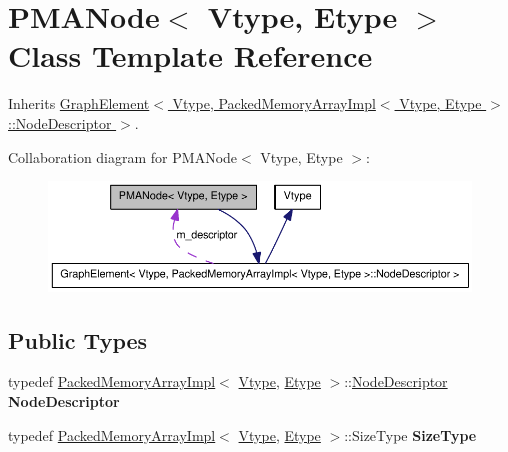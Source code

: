 \hypertarget{class_p_m_a_node}{
\section{PMANode$<$ Vtype, Etype $>$ Class Template Reference}
\label{class_p_m_a_node}
}


Inherits \hyperlink{class_graph_element}{GraphElement$<$ Vtype, PackedMemoryArrayImpl$<$ Vtype, Etype $>$::NodeDescriptor $>$}.



Collaboration diagram for PMANode$<$ Vtype, Etype $>$:\nopagebreak
\begin{figure}[H]
\begin{center}
\leavevmode
\includegraphics[width=400pt]{class_p_m_a_node__coll__graph}
\end{center}
\end{figure}
\subsection*{Public Types}
\begin{DoxyCompactItemize}
\item 
\hypertarget{class_p_m_a_node_a3246093f39da4feafb9e35c806cc2ff9}{
typedef \hyperlink{class_packed_memory_array_impl}{PackedMemoryArrayImpl}$<$ \hyperlink{class_vtype}{Vtype}, \hyperlink{class_etype}{Etype} $>$::\hyperlink{class_p_m_a_node}{NodeDescriptor} {\bfseries NodeDescriptor}}
\label{class_p_m_a_node_a3246093f39da4feafb9e35c806cc2ff9}

\item 
\hypertarget{class_p_m_a_node_af2610b975fca4e604a43d94c208f53dd}{
typedef \hyperlink{class_packed_memory_array_impl}{PackedMemoryArrayImpl}$<$ \hyperlink{class_vtype}{Vtype}, \hyperlink{class_etype}{Etype} $>$::SizeType {\bfseries SizeType}}
\label{class_p_m_a_node_af2610b975fca4e604a43d94c208f53dd}

\end{DoxyCompactItemize}
